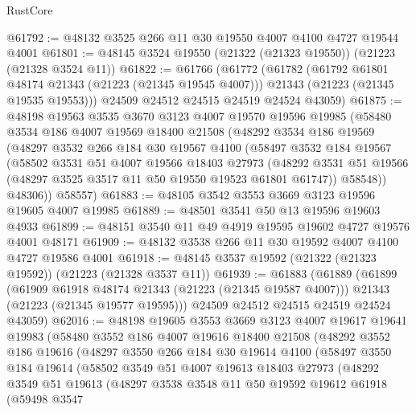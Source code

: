 \begin{lexlean}{RustCore}
\begin{coremodule}
@61792 := @48132 @3525 @266 @11 @30 @19550 @4007 @4100 @4727 @19544 @4001
@61801 := @48145 @3524 @19550 (@21322 (@21323 @19550)) (@21223 (@21328 @3524 @11))
@61822 := @61766
    (@61772
      (@61782
        (@61792 @61801 @48174 @21343 (@21223 (@21345 @19545 @4007)))
        @21343
        (@21223 (@21345 @19535 @19553)))
      @24509
      @24512
      @24515
      @24519
      @24524
      @43059)
@61875 := @48198
    @19563
    @3535
    @3670
    @3123
    @4007
    @19570
    @19596
    @19985
    (@58480
      @3534
      @186
      @4007
      @19569
      @18400
      @21508
      (@48292
        @3534
        @186
        @19569
        (@48297
          @3532
          @266
          @184
          @30
          @19567
          @4100
          (@58497
            @3532
            @184
            @19567
            (@58502
              @3531
              @51
              @4007
              @19566
              @18403
              @27973
              (@48292 @3531 @51 @19566 (@48297 @3525 @3517 @11 @50 @19550 @19523 @61801 @61747))
              @58548))
          @48306))
      @58557)
@61883 := @48105 @3542 @3553 @3669 @3123 @19596 @19605 @4007 @19985
@61889 := @48501 @3541 @50 @13 @19596 @19603 @4933
@61899 := @48151 @3540 @11 @49 @4919 @19595 @19602 @4727 @19576 @4001 @48171
@61909 := @48132 @3538 @266 @11 @30 @19592 @4007 @4100 @4727 @19586 @4001
@61918 := @48145 @3537 @19592 (@21322 (@21323 @19592)) (@21223 (@21328 @3537 @11))
@61939 := @61883
    (@61889
      (@61899
        (@61909 @61918 @48174 @21343 (@21223 (@21345 @19587 @4007)))
        @21343
        (@21223 (@21345 @19577 @19595)))
      @24509
      @24512
      @24515
      @24519
      @24524
      @43059)
@62016 := @48198
    @19605
    @3553
    @3669
    @3123
    @4007
    @19617
    @19641
    @19983
    (@58480
      @3552
      @186
      @4007
      @19616
      @18400
      @21508
      (@48292
        @3552
        @186
        @19616
        (@48297
          @3550
          @266
          @184
          @30
          @19614
          @4100
          (@58497
            @3550
            @184
            @19614
            (@58502
              @3549
              @51
              @4007
              @19613
              @18403
              @27973
              (@48292
                @3549
                @51
                @19613
                (@48297
                  @3538
                  @3548
                  @11
                  @50
                  @19592
                  @19612
                  @61918
                  (@59498
                    @3547

\end{coremodule}
\end{lexlean}
